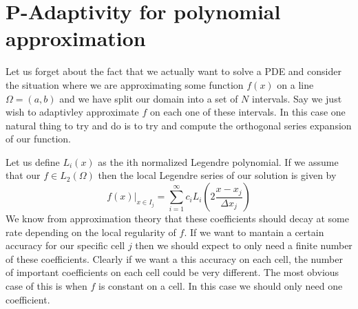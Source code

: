 \documentclass[10]{amsart}
\begin{document}
% 
% 
\section{P-Adaptivity for polynomial approximation}
Let us forget about the fact that we actually want to solve a PDE and consider the situation where we are approximating
some function $f(x)$ on a line $\Omega=(a,b)$ and we have split our domain into a set of $N$ intervals. Say we just wish
to adaptivley approximate $f$ on each one of these intervals. In this case one natural thing to try and do is to try and
compute the orthogonal series expansion of our function. 

Let us define $L_i(x)$ as the ith normalized Legendre polynomial. If we assume that our $f \in L_2 (\Omega)$
then the local Legendre series of our solution is given by 
$$f(x)|_{x \in I_j}=\sum_{i=1}^\infty c_i L_i(2\frac{x-x_j}{\Delta x_j}) $$
We know from approximation theory that these coefficients should decay at some rate
depending on the local regularity of $f$. If we want to mantain a certain
accuracy for our specific cell $j$ then we should expect to only need a finite number of these coefficients.
Clearly if we want a this accuracy on each cell, the number of important coefficients on each cell
could be very different. The most obvious case of this is when $f$ is constant on a cell. In this case we should only
need one coefficient. 
\end{document}
